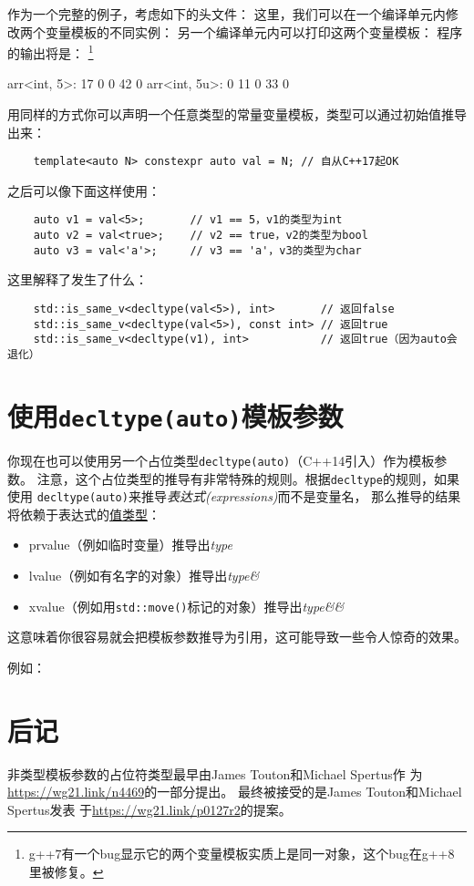 作为一个完整的例子，考虑如下的头文件：
这里，我们可以在一个编译单元内修改两个变量模板的不同实例：
另一个编译单元内可以打印这两个变量模板：
程序的输出将是：
\footnote{g++7有一个bug显示它的两个变量模板实质上是同一对象，这个bug在g++8里被修复。}
\begin{blacklisting}
    arr<int, 5>:  17 0 0 42 0
    arr<int, 5u>: 0 11 0 33 0
\end{blacklisting}
用同样的方式你可以声明一个任意类型的常量变量模板，类型可以通过初始值推导出来：
\begin{lstlisting}
    template<auto N> constexpr auto val = N; // 自从C++17起OK
\end{lstlisting}
之后可以像下面这样使用：
\begin{lstlisting}
    auto v1 = val<5>;       // v1 == 5，v1的类型为int
    auto v2 = val<true>;    // v2 == true，v2的类型为bool
    auto v3 = val<'a'>;     // v3 == 'a'，v3的类型为char
\end{lstlisting}
这里解释了发生了什么：
\begin{lstlisting}
    std::is_same_v<decltype(val<5>), int>       // 返回false
    std::is_same_v<decltype(val<5>), const int> // 返回true
    std::is_same_v<decltype(v1), int>           // 返回true（因为auto会退化）
\end{lstlisting}

\section{使用\texttt{decltype(auto)}模板参数}
你现在也可以使用另一个占位类型\texttt{decltype(auto)}（C++14引入）作为模板参数。
注意，这个占位类型的推导有非常特殊的规则。根据\texttt{decltype}的规则，如果使用
\texttt{decltype(auto)}来推导\emph{表达式(expressions)}而不是变量名，
那么推导的结果将依赖于表达式的\hyperref[ch5.3.1]{值类型}：
\begin{itemize}
    \item prvalue（例如临时变量）推导出\emph{type}
    \item lvalue（例如有名字的对象）推导出\emph{type\&}
    \item xvalue（例如用\texttt{std::move()}标记的对象）推导出\emph{type\&\&}
\end{itemize}
这意味着你很容易就会把模板参数推导为引用，这可能导致一些令人惊奇的效果。

例如：

\section{后记}
非类型模板参数的占位符类型最早由James Touton和Michael Spertus作
为\url{https://wg21.link/n4469}的一部分提出。
最终被接受的是James Touton和Michael Spertus发表
于\url{https://wg21.link/p0127r2}的提案。